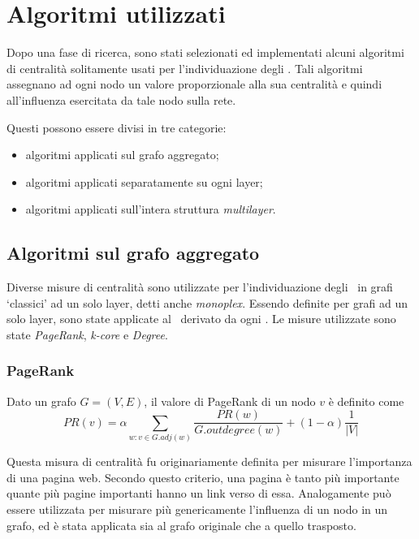 \chapter{Algoritmi utilizzati}
Dopo una fase di ricerca, sono stati selezionati ed implementati alcuni algoritmi di centralità solitamente usati per 
l'individuazione degli \infsp. Tali algoritmi assegnano ad ogni nodo un valore proporzionale alla sua centralità e 
quindi all'influenza esercitata da tale nodo sulla rete.

Questi possono essere divisi in tre categorie:
\begin{itemize}
\item algoritmi applicati sul grafo aggregato;
\item algoritmi applicati separatamente su ogni layer;
\item algoritmi applicati sull'intera struttura \textit{multilayer}.
\end{itemize}

\section{Algoritmi sul grafo aggregato}
Diverse misure di centralità sono utilizzate per l'individuazione degli \infsp\ in grafi 
`classici' ad un solo layer, detti anche \textit{monoplex}\cite{kitsak:infsp}\cite{basaras:infsp}\cite{pei:infsp}. 
Essendo definite per grafi ad un solo layer, sono state applicate al \gragg\
derivato da ogni \muln. 
Le misure utilizzate sono state \textit{PageRank}\cite{page:pagerank}, 
\textit{k-core}\cite{batagelj:kcore} e 
\textit{Degree}.


\subsection{PageRank}
\label{alg:pagerank}
\begin{definizione}[PageRank]
    \label{def:pagerank}
    Dato un grafo $G=(V, E)$, il valore di PageRank di un nodo $v$ è definito come
    \begin{equation}
        PR(v) = \alpha\sum_{w : v \in G.adj(w)}
        \frac{PR(w)}{G.outdegree(w)} + 
        (1-\alpha)\frac{1}{|V|}
    \end{equation}
\end{definizione}

Questa misura di centralità fu originariamente definita per misurare l'importanza di una pagina web. Secondo questo 
criterio, una pagina è tanto più importante quante più pagine importanti hanno un link verso di essa. Analogamente 
può essere utilizzata per misurare più genericamente l'influenza di un nodo in un grafo, ed è stata applicata sia al 
grafo originale che a quello trasposto.


